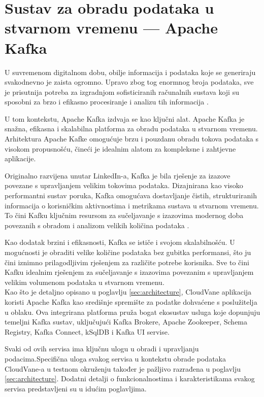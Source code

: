 \documentclass[times, utf8, diplomski]{fer}
\begin{document}
\clearpage
\section{Sustav za obradu podataka u stvarnom vremenu --- Apache Kafka}
\label{sec:kafka}

U suvremenom digitalnom dobu, obilje informacija i podataka koje se generiraju svakodnevno je zaista ogromno. Upravo zbog tog enormnog broja podataka, sve je prisutnija potreba za izgradnjom sofisticiranih računalnih sustava koji su sposobni za brzo i efikasno procesiranje i analizu tih informacija \citep{cubek_apache_2022}.

U tom kontekstu, Apache Kafka izdvaja se kao ključni alat. Apache Kafka je snažna, efikasna i skalabilna platforma za obradu podataka u stvarnom vremenu. Arhitektura Apache Kafke omogućuje brzu i pouzdanu obradu tokova podataka s visokom propusnošću, čineći je idealnim alatom za kompleksne i zahtjevne aplikacije. 

Originalno razvijena unutar LinkedIn-a, Kafka je bila rješenje za izazove povezane s upravljanjem velikim tokovima podataka. Dizajnirana kao visoko performantni sustav poruka, Kafka omogućava dostavljanje čistih, strukturiranih informacija o korisničkim aktivnostima i metrikama sustava u stvarnom vremenu. To čini Kafku ključnim resursom za sučeljavanje s izazovima modernog doba povezanih s obradom i analizom velikih količina podataka \citep{shapira_kafka_2021}.

Kao dodatak brzini i efikasnosti, Kafka se ističe i svojom skalabilnošću. U mogućnosti je obraditi velike količine podataka bez gubitka performansi, što ju čini iznimno prilagodljivim rješenjem za različite potrebe korisnika. Sve to čini Kafku idealnim rješenjem za sučeljavanje s izazovima povezanim s upravljanjem velikim volumenom podataka u stvarnom vremenu. \\

Kao što je detaljno opisano u poglavlju \ref{sec:architecture}, CloudVane aplikacija koristi Apache Kafka kao središnje spremište za podatke dohvaćene s poslužitelja u oblaku. Ova integrirana platforma pruža bogat ekosustav usluga koje dopunjuju temeljni Kafka sustav, uključujući Kafka Brokere, Apache Zookeeper, Schema Registry, Kafka Connect, kSqlDB i Kafka UI servise.

Svaki od ovih servisa ima ključnu ulogu u obradi i upravljanju podacima.Specifična uloga svakog servisa u kontekstu obrade podataka CloudVane-a u testnom okruženju također je pažljivo razrađena u poglavlju \ref{sec:architecture}. Dodatni detalji o funkcionalnostima i karakteristikama svakog servisa predstavljeni su u idućim poglavljima.\\
\end{document}
